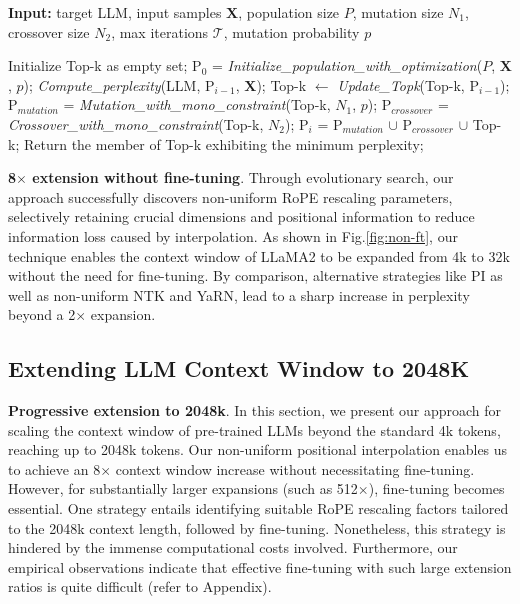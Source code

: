 \begin{algorithm}[t]
	\small
	\caption{The search algorithm}
	\textbf{Input:} target LLM, input samples $\mathbf{X}$, population size $P$, mutation size $N_1$, crossover size $N_2$, max iterations $\mathcal{T}$, mutation probability $p$\\

	\begin{algorithmic}[1]
		\label{alg:search}
		\STATE Initialize Top-k as empty set;	
		\STATE $\text{P}_0$ = \textit{Initialize\_population\_with\_optimization}($P$, $\mathbf{X}$, $p$); 
		\STATE \textit{Compute\_perplexity}(LLM, $\text{P}_{i-1}$, $\mathbf{X}$);
		\STATE  Top-k $\leftarrow$ \textit{Update\_Topk}(Top-k, $\text{P}_{i-1}$);
		\STATE $\text{P}_{mutation}$ = \textit{Mutation\_with\_mono\_constraint}(Top-k, $N_1$, $p$); 
		\STATE $\text{P}_{crossover}$ = \textit{Crossover\_with\_mono\_constraint}(Top-k, $N_2$);
		\STATE $\text{P}_i$ = $\text{P}_{mutation}$ $\cup$ $\text{P}_{crossover}$ $\cup$ Top-k;
		\ENDFOR
		\STATE Return the member of Top-k exhibiting the minimum perplexity;
	\end{algorithmic}
\end{algorithm}

\textbf{8$\times$ extension without fine-tuning}. Through evolutionary search, our approach successfully discovers non-uniform RoPE rescaling parameters, selectively retaining crucial dimensions and positional information to reduce information loss caused by interpolation. As shown in Fig.\ref{fig:non-ft}, our technique enables the context window of LLaMA2 to be expanded from 4k to 32k without the need for fine-tuning. By comparison, alternative strategies like PI as well as non-uniform NTK and YaRN, lead to a sharp increase in perplexity beyond a 2$\times$ expansion.

\subsection{Extending LLM Context Window to 2048K}
\label{sec:extendto2048k}

\textbf{Progressive extension to 2048k}. In this section, we present our approach for scaling the context window of pre-trained LLMs beyond the standard 4k tokens, reaching up to 2048k tokens. Our non-uniform positional interpolation enables us to achieve an 8$\times$ context window increase without necessitating fine-tuning. However, for substantially larger expansions (such as 512$\times$), fine-tuning becomes essential. One strategy entails identifying suitable RoPE rescaling factors tailored to the 2048k context length, followed by fine-tuning. Nonetheless, this strategy is hindered by the immense computational costs involved. Furthermore, our empirical observations indicate that effective fine-tuning with such large extension ratios is quite difficult (refer to Appendix).

